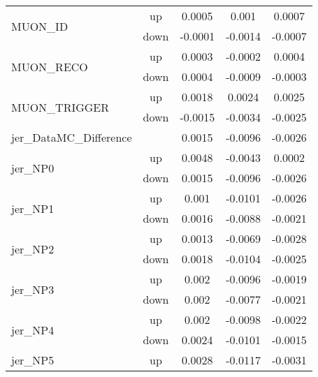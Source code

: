 \begin{table}[h!]
\begin{tabular}{lcccc}
\multirow{2}{*}{MUON\_ID}      & up   &     0.0005     &     0.001     &     0.0007      \\
                                       & down &     -0.0001     &     -0.0014     &     -0.0007       \\ \hline
\multirow{2}{*}{MUON\_RECO}      & up   &     0.0003     &     -0.0002     &     0.0004      \\
                                       & down &     0.0004     &     -0.0009     &     -0.0003       \\ \hline
\multirow{2}{*}{MUON\_TRIGGER}      & up   &     0.0018     &     0.0024     &     0.0025      \\
                                       & down &     -0.0015     &     -0.0034     &     -0.0025       \\ \hline
\multirow{2}{*}{jer\_DataMC\_Difference}  &  & \multirow{2}{*}{0.0015} & \multirow{2}{*}{-0.0096}  & \multirow{2}{*}{-0.0026}  \\  \\ \hline
\multirow{2}{*}{jer\_NP0}      & up   &     0.0048     &     -0.0043     &     0.0002      \\
                                       & down &     0.0015     &     -0.0096     &     -0.0026       \\ \hline
\multirow{2}{*}{jer\_NP1}      & up   &     0.001     &     -0.0101     &     -0.0026      \\
                                       & down &     0.0016     &     -0.0088     &     -0.0021       \\ \hline
\multirow{2}{*}{jer\_NP2}      & up   &     0.0013     &     -0.0069     &     -0.0028      \\
                                       & down &     0.0018     &     -0.0104     &     -0.0025       \\ \hline
\multirow{2}{*}{jer\_NP3}      & up   &     0.002     &     -0.0096     &     -0.0019      \\
                                       & down &     0.002     &     -0.0077     &     -0.0021       \\ \hline
\multirow{2}{*}{jer\_NP4}      & up   &     0.002     &     -0.0098     &     -0.0022      \\
                                       & down &     0.0024     &     -0.0101     &     -0.0015       \\ \hline
\multirow{2}{*}{jer\_NP5}      & up   &     0.0028     &     -0.0117     &     -0.0031      \\

\end{tabular}
\end{table}
